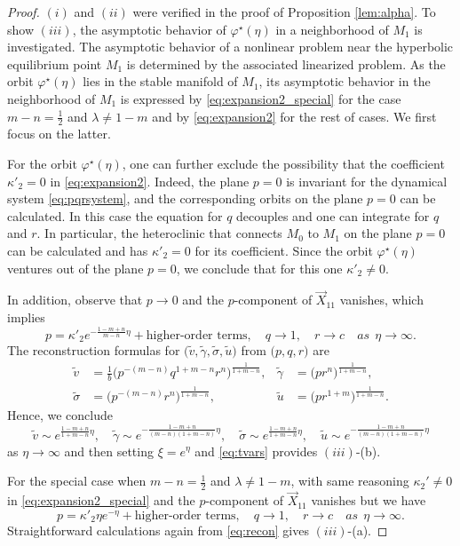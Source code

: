 \documentclass[a4paper,11pt]{article}
\def\tg{\tilde{\gamma}}
\def\ts{\tilde{\sigma}}
\def\tv{\tilde{v}}
\def\tu{\tilde{u}}
\numberwithin{step}{dummy}
\begin{document}
\begin{proof}
  $(i)$ and $(ii)$ were verified in the proof of  Proposition \ref{lem:alpha}. To show $(iii)$, the asymptotic behavior of $\varphi^\star(\eta)$ in a neighborhood of $M_1$ is investigated. The asymptotic behavior of a nonlinear problem near the hyperbolic equilibrium point $M_1$ is determined by the associated linearized problem. 
As the orbit $\varphi^\star(\eta)$ lies in the stable manifold of $M_1$,  its asymptotic behavior  in the neighborhood of $M_1$ is expressed by \eqref{eq:expansion2_special} for the case $m-n= \frac{1}{2}$ and $\lambda \ne 1-m$ and by \eqref{eq:expansion2} for the rest of cases. We first focus on the latter.

For the orbit $\varphi^\star(\eta)$, one can further exclude the possibility that the coefficient $\kappa'_2 = 0$ in \eqref{eq:expansion2}.
Indeed,  the plane $p=0$ is invariant for the dynamical system \eqref{eq:pqrsystem}, and the corresponding orbits on the plane $p=0$ can be calculated. 
In this case  the equation for $q$ decouples and one can integrate for $q$ and $r$. 
In particular, the heteroclinic that connects $M_0$ to $M_1$ on the plane $p =0$  can be calculated and has  $\kappa'_2 = 0$ for its coefficient. 
Since the orbit $\varphi^\star(\eta)$ ventures out of the plane $p=0$, we conclude that for this one $\kappa'_2\ne0$. 

In addition, observe that $p \rightarrow 0$ and the $p$-component of $\vec{X}_{11}$ vanishes, which implies 
$$p = \kappa'_2e^{- \frac{1-m+n}{m-n}\eta} + \text{higher-order terms}, \quad q\rightarrow 1, \quad r\rightarrow c\quad  as ~~\eta \rightarrow \infty.$$
The reconstruction formulas for $\big(\tv,\tg,\ts,\tu\big)$ from $\big(p,q,r\big)$ are 
\begin{equation}
\begin{aligned}
\tv &= \frac{1}{b}\Big( p^{-(m-n)}q^{1+m-n}r^n \Big)^{ \frac{1}{1+m-n}},&
\tg &= \Big( pr^n \Big)^{ \frac{1}{1+m-n}},\\
\ts &= \Big( p^{-(m-n)}r^n \Big)^{ \frac{1}{1+m-n}},&
\tu &= \Big( pr^{1+m} \Big)^{ \frac{1}{1+m-n}}.
\end{aligned}\label{eq:recon}
\end{equation}
Hence, we conclude
\begin{equation*}
  \tv \sim e^{ \frac{1-m+n}{1+m-n}\eta}, \quad \tg \sim e^{-\frac{1-m+n}{(m-n)(1+m-n)}\eta}, \quad   \ts \sim e^{\frac{1-m+n}{1+m-n}\eta}, \quad \tu \sim e^{-\frac{1-m+n}{(m-n)(1+m-n)}\eta} 
\end{equation*}
as $\eta \rightarrow \infty$ and then setting  $\xi = e^\eta$ and \eqref{eq:tvars} provides $(iii)$-(b).

For the special case when $m-n= \frac{1}{2}$ and $\lambda \ne 1-m$, with same reasoning $\kappa_2'\ne0$ in \eqref{eq:expansion2_special} and the $p$-component of $\vec{X}_{11}$ vanishes but we have
$$p = \kappa'_2 \eta e^{-\eta} + \text{higher-order terms}, \quad q\rightarrow 1, \quad r\rightarrow c\quad  as ~~\eta \rightarrow \infty.$$
Straightforward calculations again from \eqref{eq:recon} gives $(iii)$-(a).
\end{proof}
\end{document}
